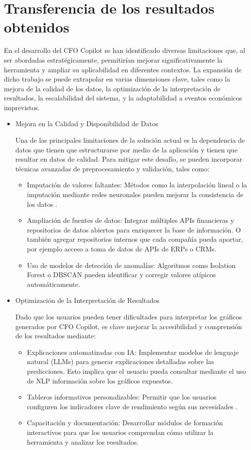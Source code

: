 \documentclass[12pt,letterpaper,oneside]{report}
\renewcommand{\_}{\UnderscoreOriginal\allowbreak}
\begin{document}
\section{Transferencia de los resultados obtenidos}
En el desarrollo del CFO Copilot se han identificado diversas limitaciones que, al ser abordadas estratégicamente, permitirían mejorar significativamente la herramienta y ampliar su aplicabilidad en diferentes contextos. La expansión de dicho trabajo se puede extrapolar en varias dimensiones clave, tales como la mejora de la calidad de los datos, la optimización de la interpretación de resultados, la escalabilidad del sistema, y la adaptabilidad a eventos económicos imprevistos.
\begin{itemize}
\item Mejora en la Calidad y Disponibilidad de Datos

Una de las principales limitaciones de la solución actual es la dependencia de datos que tienen que estructurarse por medio de la aplicación y tienen que resultar en datos de calidad. Para mitigar este desafío, se pueden incorporar técnicas avanzadas de preprocesamiento y validación, tales como:
\begin{itemize}
\item Imputación de valores faltantes: Métodos como la interpolación lineal o la imputación mediante redes neuronales pueden mejorar la consistencia de los datos \parencite{Chawla2002}.
\item Ampliación de fuentes de datos: Integrar múltiples APIs financieras y repositorios de datos abiertos para enriquecer la base de información. O también agregar repositorios internos que cada compañía pueda aportar, por ejemplo acceso a toma de datos de APIs de ERPs o CRMs.
\item Uso de modelos de detección de anomalías: Algoritmos como Isolation Forest \parencite{Liu2008} o DBSCAN \parencite{Jain2021} pueden identificar y corregir valores atípicos automáticamente.
\end{itemize}
\item Optimización de la Interpretación de Resultados

Dado que los usuarios pueden tener dificultades para interpretar los gráficos generados por CFO Copilot, es clave mejorar la accesibilidad y comprensión de los resultados mediante:
\begin{itemize}
\item Explicaciones automatizadas con IA: Implementar modelos de lenguaje natural (LLMs) para generar explicaciones detalladas sobre las predicciones. Esto implica que el usuario pueda consultar mediante el uso de NLP información sobre los gráficos expuestos.
\item Tableros informativos personalizables: Permitir que los usuarios configuren los indicadores clave de rendimiento según sus necesidades \parencite{Agarwal2024}.
\item Capacitación y documentación: Desarrollar módulos de formación interactivos para que los usuarios comprendan cómo utilizar la herramienta y analizar los resultados.
\end{itemize}


\end{itemize}
\end{document}
